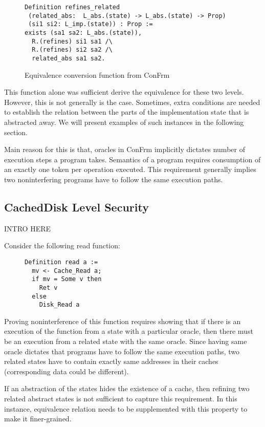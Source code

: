 \begin{figure}[ht]
    \centering
\begin{verbatim}
Definition refines_related 
 (related_abs:  L_abs.(state) -> L_abs.(state) -> Prop)
 (si1 si2: L_imp.(state)) : Prop :=
exists (sa1 sa2: L_abs.(state)),
  R.(refines) si1 sa1 /\
  R.(refines) si2 sa2 /\
  related_abs sa1 sa2.
\end{verbatim}
    \caption{Equivalence conversion function from ConFrm}
    \label{fig:refines_related}
\end{figure}

This function alone was sufficient derive the equivalence for these two levels. However, this is not generally is the case. Sometimes, extra conditions are needed to establish the relation between the parts of the implementation state that is abstracted away. We will present examples of such instances in the following section.

Main reason for this is that, oracles in ConFrm implicitly dictates number of execution steps a program takes. Semantics of a program requires consumption of an exactly one token per operation executed. This requirement generally implies two noninterfering programs have to follow the same execution paths. 


\subsection{CachedDisk Level Security}
{\color{red} INTRO HERE}

Consider the following read function:

\begin{figure}[ht]
    \centering
\begin{verbatim}
Definition read a :=
  mv <- Cache_Read a;
  if mv = Some v then 
    Ret v
  else
    Disk_Read a
\end{verbatim}
    \label{fig:refines_related}
\end{figure}
%
Proving noninterference of this function requires showing that if there is an execution of the function from a state with a particular oracle, then there must be an execution from a related state with the same oracle. Since having same oracle dictates that programs have to follow the same execution paths, two related states have to contain exactly same addresses in their caches (corresponding data could be different).

If an abstraction of the states hides the existence of a cache, then refining two related abstract states is not sufficient to capture this requirement. In this instance, equivalence relation needs to be supplemented with this property to make it finer-grained.

